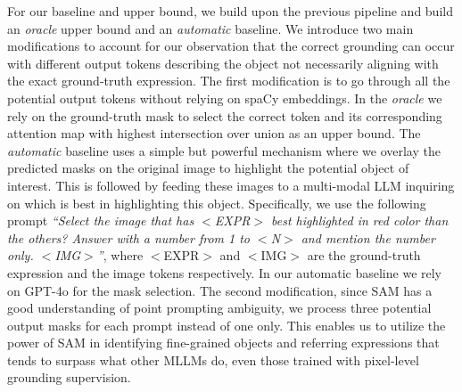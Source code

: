 For our baseline and upper bound, we build upon the previous pipeline and build an \textit{oracle} upper bound and an \textit{automatic} baseline. We introduce two main modifications to account for our observation that the correct grounding can occur with different output tokens describing the object not necessarily aligning with the exact ground-truth expression. The first modification is to go through all the potential output tokens without relying on spaCy embeddings. In the \textit{oracle} we rely on the ground-truth mask to select the correct token and its corresponding attention map with highest intersection over union as an upper bound. The \textit{automatic} baseline uses a simple but powerful mechanism where we overlay the predicted masks on the original image to highlight the potential object of interest. This is followed by feeding these images to a multi-modal LLM inquiring on which is best in highlighting this object. Specifically, we use the following prompt \textit{``Select the image that has $<$EXPR$>$ best highlighted in red color than the others? Answer with a number from 1 to $<$N$>$ and mention the number only. $<$IMG$>$''}, where  $<$EXPR$>$ and $<$IMG$>$ are the ground-truth expression and the image tokens respectively. In our automatic baseline we rely on GPT-4o for the mask selection. The second modification, since SAM has a good understanding of point prompting ambiguity, we process three potential output masks for each prompt instead of one only. This enables us to utilize the power of SAM in identifying fine-grained objects and referring expressions that tends to surpass what other MLLMs do, even those trained with pixel-level grounding supervision. %

